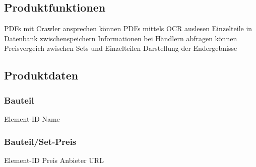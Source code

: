\subsection{Produktfunktionen}
PDFs mit Crawler ansprechen können \newline
PDFs mittels OCR auslesen \newline
Einzelteile in Datenbank zwischenspeichern \newline
Informationen bei Händlern abfragen können \newline
Preisvergeich zwischen Sets und Einzelteilen \newline
Darstellung der Endergebnisse \newline

\subsection{Produktdaten}

\subsubsection{Bauteil}
Element-ID\newline
Name \newline

\subsubsection{Bauteil/Set-Preis}
Element-ID\newline
Preis\newline
Anbieter\newline
URL\newline


